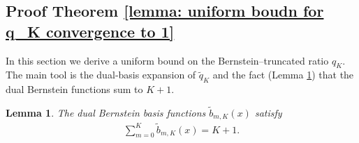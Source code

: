 \documentclass{article}
\newtheorem{lemma}{Lemma}[section]
\begin{document}
\subsection{Proof Theorem \ref{lemma: uniform boudn for q_K convergence to 1}}

In this section we derive a uniform bound on the Bernstein–truncated ratio \(q_K\).  The main tool is the dual‐basis expansion of \(\tilde q_K\) and the fact (Lemma \ref{lemma:dual_basis_sum}) that the dual Bernstein functions sum to \(K+1\).

\begin{lemma}
\label{lemma:dual_basis_sum}
The dual Bernstein basis functions \(\tilde{b}_{m,K}(x)\) satisfy
\begin{align*}
\sum_{m=0}^{K}\tilde{b}_{m,K}(x)=K+1.
\end{align*}
\end{lemma}

\end{document}
